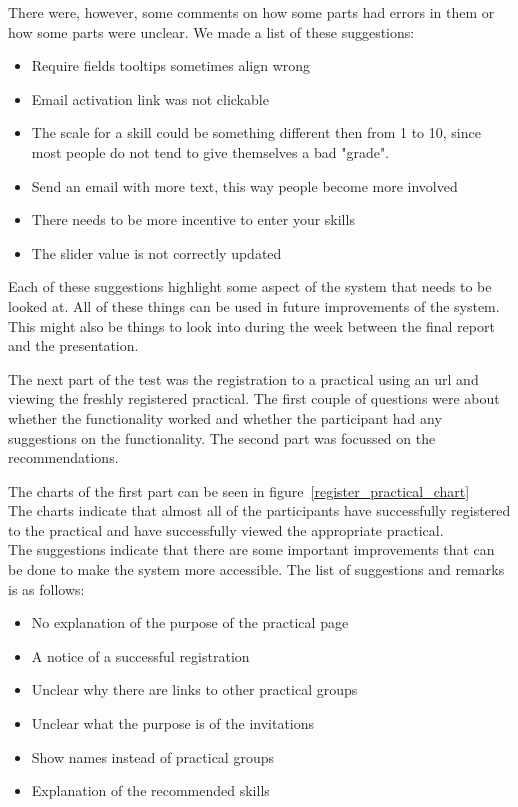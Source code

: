 There were, however, some comments on how some parts had errors in them or how some parts were unclear. We made a list of these suggestions:
\begin{itemize}
\item Require fields tooltips sometimes align wrong
\item Email activation link was not clickable
\item The scale for a skill could be something different then from 1 to 10, since most people do not tend to give themselves a bad "grade".
\item Send an email with more text, this way people become more involved
\item There needs to be more incentive to enter your skills
\item The slider value is not correctly updated
\end{itemize}

Each of these suggestions highlight some aspect of the system that needs to be looked at.
All of these things can be used in future improvements of the system.
This might also be things to look into during the week between the final report and the presentation.

The next part of the test was the registration to a practical using an url and viewing the freshly registered practical.
The first couple of questions were about whether the functionality worked and whether the participant had any suggestions on the functionality.
The second part was focussed on the recommendations.

The charts of the first part can be seen in figure~\ref{register_practical_chart}\\

The charts indicate that almost all of the participants have successfully registered to the practical and have successfully viewed the appropriate practical.\\

The suggestions indicate that there are some important improvements that can be done to make the system more accessible.
The list of suggestions and remarks is as follows:
\begin{itemize}
\item No explanation of the purpose of the practical page
\item A notice of a successful registration
\item Unclear why there are links to other practical groups
\item Unclear what the purpose is of the invitations
\item Show names instead of practical groups
\item Explanation of the recommended skills
\end{itemize}

